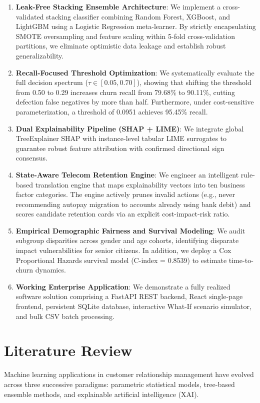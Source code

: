 \documentclass[conference]{IEEEtran}
\begin{document}
\begin{enumerate}
    \item \textbf{Leak-Free Stacking Ensemble Architecture}: We implement a cross-validated stacking classifier combining Random Forest, XGBoost, and LightGBM using a Logistic Regression meta-learner. By strictly encapsulating SMOTE oversampling and feature scaling within 5-fold cross-validation partitions, we eliminate optimistic data leakage and establish robust generalizability.
    \item \textbf{Recall-Focused Threshold Optimization}: We systematically evaluate the full decision spectrum ($\tau \in [0.05, 0.70]$), showing that shifting the threshold from 0.50 to 0.29 increases churn recall from 79.68\% to 90.11\%, cutting defection false negatives by more than half. Furthermore, under cost-sensitive parameterization, a threshold of 0.0951 achieves 95.45\% recall.
    \item \textbf{Dual Explainability Pipeline (SHAP + LIME)}: We integrate global TreeExplainer SHAP with instance-level tabular LIME surrogates to guarantee robust feature attribution with confirmed directional sign consensus.
    \item \textbf{State-Aware Telecom Retention Engine}: We engineer an intelligent rule-based translation engine that maps explainability vectors into ten business factor categories. The engine actively prunes invalid actions (e.g., never recommending autopay migration to accounts already using bank debit) and scores candidate retention cards via an explicit cost-impact-risk ratio.
    \item \textbf{Empirical Demographic Fairness and Survival Modeling}: We audit subgroup disparities across gender and age cohorts, identifying disparate impact vulnerabilities for senior citizens. In addition, we deploy a Cox Proportional Hazards survival model (C-index = 0.8539) to estimate time-to-churn dynamics.
    \item \textbf{Working Enterprise Application}: We demonstrate a fully realized software solution comprising a FastAPI REST backend, React single-page frontend, persistent SQLite database, interactive What-If scenario simulator, and bulk CSV batch processing.
\end{enumerate}

\section{Literature Review}
Machine learning applications in customer relationship management have evolved across three successive paradigms: parametric statistical models, tree-based ensemble methods, and explainable artificial intelligence (XAI).
\end{document}
